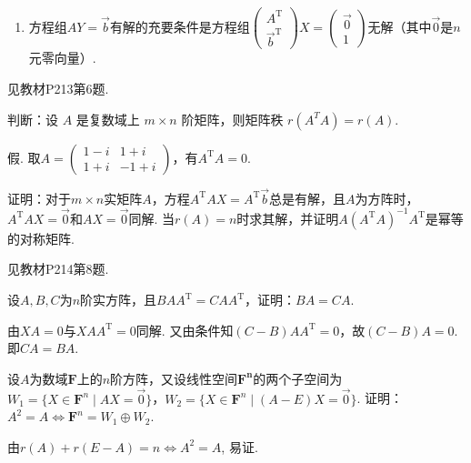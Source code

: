 \begin{exercise}
\begin{exgroup}
\begin{enumerate}
            \item 方程组$AY=\vec{b}$有解的充要条件是方程组$\begin{pmatrix}
                          A^\mathrm{T} \\ \vec{b}^\mathrm{T}
                      \end{pmatrix}X=\begin{pmatrix}
                          \vec{0} \\ 1
                      \end{pmatrix}$无解（其中$\vec{0}$是$n$元零向量）.
        \end{enumerate}
        \begin{answer}
            见教材P213第6题.
        \end{answer}

        \item 判断：设 $A$ 是复数域上 $m \times n$ 阶矩阵，则矩阵秩 $r\left(A^T A\right)=r(A)$.
        \begin{answer}
            假. 取$A=\begin{pmatrix}
                1-i & 1+i  \\
                1+i & -1+i
            \end{pmatrix}$，有$A^\mathrm{T}A=0$.
        \end{answer}

        \item 证明：对于$m \times n$实矩阵$A$，方程$A^\mathrm{T}AX = A^\mathrm{T}\vec{b}$总是有解，且$A$为方阵时，$A^\mathrm{T}AX = \vec{0}$和$AX=\vec{0}$同解. 当$r(A)=n$时求其解，并证明$A(A^\mathrm{T}A)^{-1}A^\mathrm{T}$是幂等的对称矩阵.
        \begin{answer}
            见教材P214第8题.
        \end{answer}

        \item 设$A,B,C$为$n$阶实方阵，且$BAA^\mathrm{T}=CAA^\mathrm{T}$，证明：$BA=CA$.
        \begin{answer}
            由$XA=0$与$XAA^{\mathrm{T}}=0$同解. 又由条件知$(C-B)AA^\mathrm{T}=0$，故$(C-B)A=0$. 即$CA=BA$.
        \end{answer}

        \item 设$A$为数域$\mathbf{F}$上的$n$阶方阵，又设线性空间$\mathbf{F^n}$的两个子空间为$W_1=\{X\in\mathbf{F}^n \mid AX=\vec{0}\}$，$W_2=\{X\in\mathbf{F}^n \mid (A-E)X=\vec{0}\}$. 证明：$A^2=A \iff \mathbf{F}^n=W_1\oplus W_2$.
        \begin{answer}
            由$r(A)+r(E-A)=n \iff A^2=A$, 易证.
        \end{answer}


\end{exgroup}
\end{exercise}
